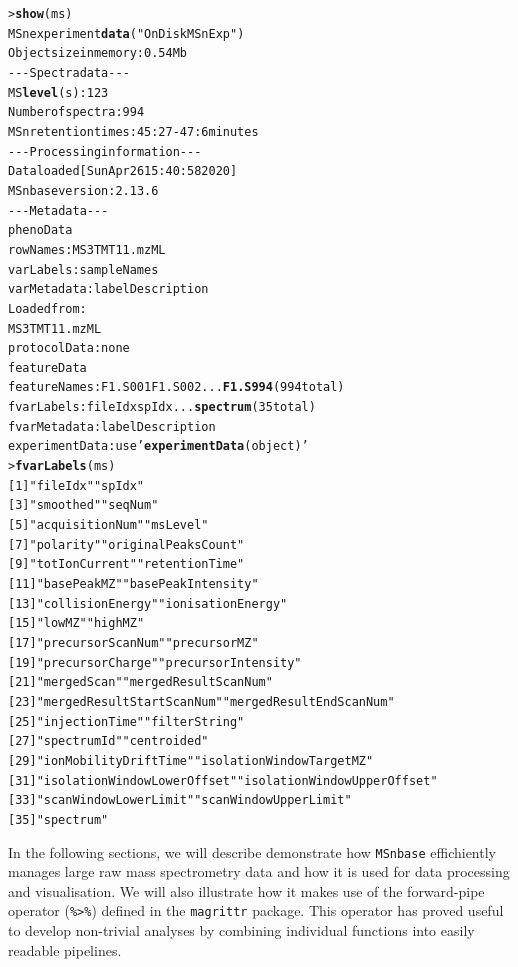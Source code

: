 \documentclass[journal=jacsat,manuscript=article]{achemso}\usepackage[]{graphicx}\usepackage[]{color}
\makeatletter
\newcommand{\hlstr}[1]{\textcolor[rgb]{0.192,0.494,0.8}{#1}}%
\newcommand{\hlkwd}[1]{\textcolor[rgb]{0.737,0.353,0.396}{\textbf{#1}}}%
\newenvironment{kframe}{%
 \def\at@end@of@kframe{}%
 \ifinner\ifhmode%
  \def\at@end@of@kframe{\end{minipage}}%
  \begin{minipage}{\columnwidth}%
 \fi\fi%
 \def\FrameCommand##1{\hskip\@totalleftmargin \hskip-\fboxsep
 \colorbox{shadecolor}{##1}\hskip-\fboxsep
     \hskip-\linewidth \hskip-\@totalleftmargin \hskip\columnwidth}%
 \MakeFramed {\advance\hsize-\width
   \@totalleftmargin\z@ \linewidth\hsize
   \@setminipage}}%
 {\par\unskip\endMakeFramed%
 \at@end@of@kframe}
\newenvironment{knitrout}{}{} %
\makeatother
\begin{document}
\begin{knitrout}
\color{fgcolor}\begin{kframe}
\begin{alltt}
> \hlkwd{show}(ms)
MSn experiment \hlkwd{data} (\hlstr{"OnDiskMSnExp"})
Object size in memory: 0.54 Mb
- - - Spectra data - - -
 MS \hlkwd{level}(s): 1 2 3 
 Number of spectra: 994 
 MSn retention times: 45:27 - 47:6 minutes
- - - Processing information - - -
Data loaded [Sun Apr 26 15:40:58 2020] 
 MSnbase version: 2.13.6 
- - - Meta data  - - -
phenoData
  rowNames: MS3TMT11.mzML
  varLabels: sampleNames
  varMetadata: labelDescription
Loaded from:
  MS3TMT11.mzML 
protocolData: none
featureData
  featureNames: F1.S001 F1.S002 ... \hlkwd{F1.S994} (994 total)
  fvarLabels: fileIdx spIdx ... \hlkwd{spectrum} (35 total)
  fvarMetadata: labelDescription
experimentData: use \hlstr{'\hlkwd{experimentData}(object)'}
> \hlkwd{fvarLabels}(ms)
 [1] \hlstr{"fileIdx"}                    \hlstr{"spIdx"}
 [3] \hlstr{"smoothed"}                   \hlstr{"seqNum"}
 [5] \hlstr{"acquisitionNum"}             \hlstr{"msLevel"}
 [7] \hlstr{"polarity"}                   \hlstr{"originalPeaksCount"}
 [9] \hlstr{"totIonCurrent"}              \hlstr{"retentionTime"}
[11] \hlstr{"basePeakMZ"}                 \hlstr{"basePeakIntensity"}
[13] \hlstr{"collisionEnergy"}            \hlstr{"ionisationEnergy"}
[15] \hlstr{"lowMZ"}                      \hlstr{"highMZ"}
[17] \hlstr{"precursorScanNum"}           \hlstr{"precursorMZ"}
[19] \hlstr{"precursorCharge"}            \hlstr{"precursorIntensity"}
[21] \hlstr{"mergedScan"}                 \hlstr{"mergedResultScanNum"}
[23] \hlstr{"mergedResultStartScanNum"}   \hlstr{"mergedResultEndScanNum"}
[25] \hlstr{"injectionTime"}              \hlstr{"filterString"}
[27] \hlstr{"spectrumId"}                 \hlstr{"centroided"}
[29] \hlstr{"ionMobilityDriftTime"}       \hlstr{"isolationWindowTargetMZ"}
[31] \hlstr{"isolationWindowLowerOffset"} \hlstr{"isolationWindowUpperOffset"}
[33] \hlstr{"scanWindowLowerLimit"}       \hlstr{"scanWindowUpperLimit"}
[35] \hlstr{"spectrum"}
\end{alltt}
\end{kframe}
\end{knitrout}

In the following sections, we will describe demonstrate how
\texttt{MSnbase} effichiently manages large raw mass spectrometry data
and how it is used for data processing and visualisation. We will also
illustrate how it makes use of the forward-pipe operator
(\texttt{\%>\%}) defined in the \texttt{magrittr} package. This
operator has proved useful to develop non-trivial analyses by
combining individual functions into easily readable pipelines.
\end{document}
